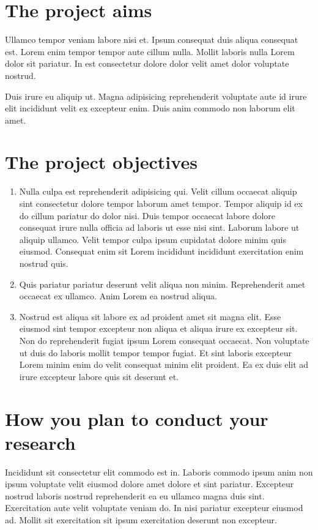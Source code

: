 \documentclass[a4paper, notitlepage, 12pt]{article}
\begin{document}
\section{The project aims}
Ullamco tempor veniam labore nisi et. Ipsum consequat duis aliqua consequat est. Lorem enim tempor tempor aute cillum nulla. Mollit laboris nulla Lorem dolor sit pariatur. In est consectetur dolore dolor velit amet dolor voluptate nostrud.

Duis irure eu aliquip ut. Magna adipisicing reprehenderit voluptate aute id irure elit incididunt velit ex excepteur enim. Duis anim commodo non laborum elit amet.

\section{The project objectives}

\begin{enumerate}
    \item Nulla culpa est reprehenderit adipisicing qui. Velit cillum occaecat aliquip sint consectetur dolore tempor laborum amet tempor. Tempor aliquip id ex do cillum pariatur do dolor nisi. Duis tempor occaecat labore dolore consequat irure nulla officia ad laboris ut esse nisi sint. Laborum labore ut aliquip ullamco. Velit tempor culpa ipsum cupidatat dolore minim quis eiusmod. Consequat enim sit Lorem incididunt incididunt exercitation enim nostrud quis.

    \item Quis pariatur pariatur deserunt velit aliqua non minim. Reprehenderit amet occaecat ex ullamco. Anim Lorem ea nostrud aliqua.

    \item Nostrud est aliqua sit labore ex ad proident amet sit magna elit. Esse eiusmod sint tempor excepteur non aliqua et aliqua irure ex excepteur sit. Non do reprehenderit fugiat ipsum Lorem consequat occaecat. Non voluptate ut duis do laboris mollit tempor tempor fugiat. Et sint laboris excepteur Lorem minim enim do velit consequat minim elit proident. Ea ex duis elit ad irure excepteur labore quis sit deserunt et.
\end{enumerate}

\section{How you plan to conduct your research}
Incididunt sit consectetur elit commodo est in. Laboris commodo ipsum anim non ipsum voluptate velit eiusmod dolore amet dolore et sint pariatur. Excepteur nostrud laboris nostrud reprehenderit ea eu ullamco magna duis sint. Exercitation aute velit voluptate veniam do. In nisi pariatur excepteur eiusmod ad. Mollit sit exercitation sit ipsum exercitation deserunt non excepteur.



\end{document}

